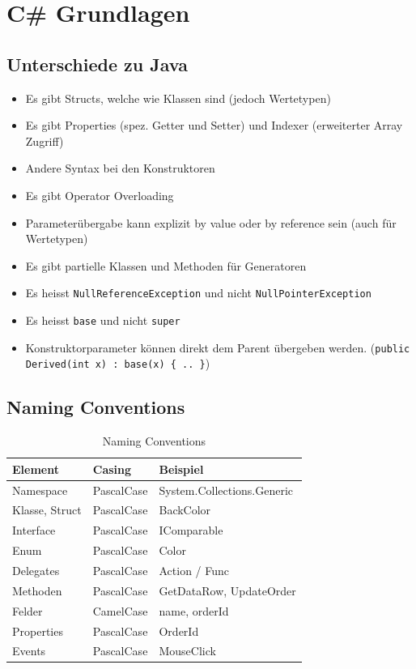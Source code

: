 \section{C\# Grundlagen}
\subsection{Unterschiede zu Java}
\begin{itemize}
	\item Es gibt Structs, welche wie Klassen sind (jedoch Wertetypen)
	\item Es gibt Properties (spez. Getter und Setter) und Indexer (erweiterter Array Zugriff)
	\item Andere Syntax bei den Konstruktoren
	\item Es gibt Operator Overloading
	\item Parameterübergabe kann explizit by value oder by reference sein (auch für Wertetypen)
	\item Es gibt partielle Klassen und Methoden für Generatoren
	\item Es heisst \lstinline|NullReferenceException| und nicht \lstinline|NullPointerException|
	\item Es heisst \lstinline|base| und nicht \lstinline|super|
	\item Konstruktorparameter können direkt dem Parent übergeben werden. (\lstinline|public Derived(int x) : base(x) { .. }|)
\end{itemize}

\subsection{Naming Conventions}
\begin{table}[h]
	\centering
	\begin{tabu} to \linewidth {l l l}
		\toprule 
		Element & Casing  & Beispiel \\
		\midrule
		Namespace & PascalCase & System.Collections.Generic \\
		Klasse, Struct & PascalCase & BackColor \\
		Interface & PascalCase & IComparable\\
		Enum & PascalCase & Color\\
		Delegates & PascalCase & Action / Func\\
		Methoden & PascalCase & GetDataRow, UpdateOrder\\
		Felder & CamelCase & name, orderId \\
		Properties & PascalCase & OrderId \\
		Events & PascalCase & MouseClick \\
		\bottomrule
	\end{tabu} 
	\caption{Naming Conventions}
\end{table}

